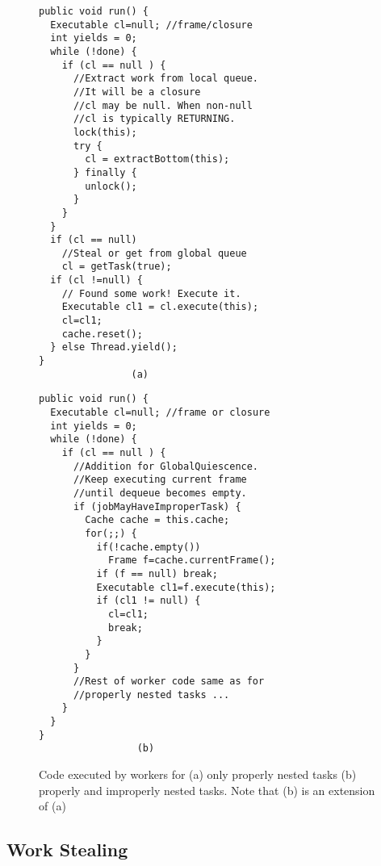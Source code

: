 \begin{figure*}
\begin{minipage}{0.5\textwidth}
\begin{verbatim}
public void run() {
  Executable cl=null; //frame/closure
  int yields = 0;
  while (!done) {
    if (cl == null ) {
      //Extract work from local queue.
      //It will be a closure
      //cl may be null. When non-null
      //cl is typically RETURNING.
      lock(this);
      try {
        cl = extractBottom(this);
      } finally {
        unlock();
      }
    }
  }
  if (cl == null)
    //Steal or get from global queue
    cl = getTask(true);  
  if (cl !=null) {
    // Found some work! Execute it.
    Executable cl1 = cl.execute(this);
    cl=cl1;
    cache.reset();
  } else Thread.yield();
}
                (a)
\end{verbatim}
\end{minipage}%
\begin{minipage}{0.5\textwidth}
\begin{verbatim}
public void run() {
  Executable cl=null; //frame or closure
  int yields = 0;
  while (!done) {
    if (cl == null ) {
      //Addition for GlobalQuiescence. 
      //Keep executing current frame 
      //until dequeue becomes empty.
      if (jobMayHaveImproperTask) {
        Cache cache = this.cache;
        for(;;) {
          if(!cache.empty())
            Frame f=cache.currentFrame();
          if (f == null) break;
          Executable cl1=f.execute(this);
          if (cl1 != null) {
            cl=cl1;
            break;
          }
        }
      } 
      //Rest of worker code same as for
      //properly nested tasks ...
    }
  }
}
                 (b)
\end{verbatim}
\end{minipage}
\caption{Code executed by workers for (a) only properly nested tasks (b)
  properly and improperly nested tasks. Note that (b) is an extension of (a)}
\label{fig:worker-code}
\end{figure*}


\subsection{Work Stealing}




